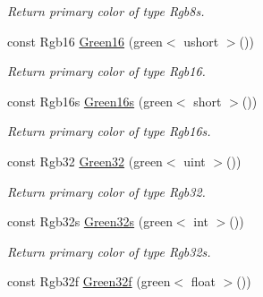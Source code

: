 \begin{DoxyCompactItemize}
\begin{DoxyCompactList}\small\item\em Return primary color of type Rgb8s. \end{DoxyCompactList}\item 
\hypertarget{group___primary_colors_ga464f40dc254a022abe65c258a88f2ac7}{const Rgb16 \hyperlink{group___primary_colors_ga464f40dc254a022abe65c258a88f2ac7}{Green16} (green$<$ ushort $>$())}\label{group___primary_colors_ga464f40dc254a022abe65c258a88f2ac7}

\begin{DoxyCompactList}\small\item\em Return primary color of type Rgb16. \end{DoxyCompactList}\item 
\hypertarget{group___primary_colors_gaf9d52ad7cd375f81b300695aa8e8ec49}{const Rgb16s \hyperlink{group___primary_colors_gaf9d52ad7cd375f81b300695aa8e8ec49}{Green16s} (green$<$ short $>$())}\label{group___primary_colors_gaf9d52ad7cd375f81b300695aa8e8ec49}

\begin{DoxyCompactList}\small\item\em Return primary color of type Rgb16s. \end{DoxyCompactList}\item 
\hypertarget{group___primary_colors_ga755128523dd655916ca3e55eb90a6727}{const Rgb32 \hyperlink{group___primary_colors_ga755128523dd655916ca3e55eb90a6727}{Green32} (green$<$ uint $>$())}\label{group___primary_colors_ga755128523dd655916ca3e55eb90a6727}

\begin{DoxyCompactList}\small\item\em Return primary color of type Rgb32. \end{DoxyCompactList}\item 
\hypertarget{group___primary_colors_ga594299db7793fb76b6005da5b14e0f0b}{const Rgb32s \hyperlink{group___primary_colors_ga594299db7793fb76b6005da5b14e0f0b}{Green32s} (green$<$ int $>$())}\label{group___primary_colors_ga594299db7793fb76b6005da5b14e0f0b}

\begin{DoxyCompactList}\small\item\em Return primary color of type Rgb32s. \end{DoxyCompactList}\item 
\hypertarget{group___primary_colors_ga4ff41245084297b158f1edb21f8fc983}{const Rgb32f \hyperlink{group___primary_colors_ga4ff41245084297b158f1edb21f8fc983}{Green32f} (green$<$ float $>$())}\label{group___primary_colors_ga4ff41245084297b158f1edb21f8fc983}


\end{DoxyCompactItemize}
